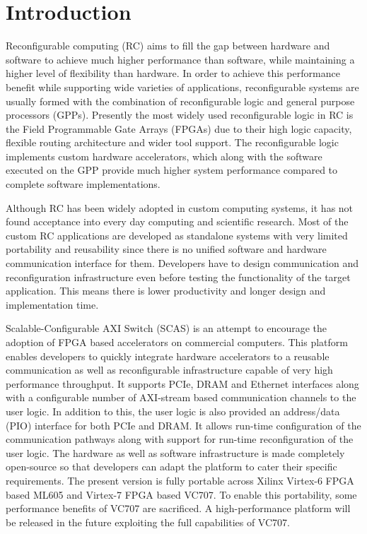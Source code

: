 \chapter{Introduction}
\label{chap_intro}

Reconfigurable computing (RC) aims to fill the gap between hardware and software to achieve much higher performance than software, while maintaining a higher level of flexibility than hardware.
In order to achieve this performance benefit while supporting wide varieties of applications, reconfigurable systems are usually formed with the combination of reconfigurable logic and general purpose processors (GPPs).
Presently the most widely used reconfigurable logic in RC is the Field Programmable Gate Arrays (FPGAs) due to their high logic capacity, flexible routing architecture and wider tool support.
The reconfigurable logic implements custom hardware accelerators, which along with the software executed on the GPP provide much higher system performance compared to complete software implementations.

Although RC has been widely adopted in custom computing systems, it has not found acceptance into every day computing and scientific research.
Most of the custom RC applications are developed as standalone systems with very limited portability and reusability since there is no unified software and hardware communication interface for them.
Developers have to design communication and reconfiguration infrastructure even before testing the functionality of the target application.
This means there is lower productivity and longer design and implementation time.

Scalable-Configurable AXI Switch (SCAS) is an attempt to encourage the adoption of FPGA based accelerators on commercial computers.
This platform enables developers to quickly integrate hardware accelerators to a reusable communication as well as reconfigurable infrastructure capable of very high performance throughput. 
It supports PCIe, DRAM and Ethernet interfaces along with a configurable number of AXI-stream based communication channels to the user logic.
In addition to this, the user logic is also provided an address/data (PIO) interface for both PCIe and DRAM.
It allows run-time configuration of the communication pathways along with support for run-time reconfiguration of the user logic.
The hardware as well as software infrastructure is made completely open-source so that developers can adapt the platform to cater their specific requirements.
The present version is fully portable across Xilinx Virtex-6 FPGA based ML605 and Virtex-7 FPGA based VC707.
To enable this portability, some performance benefits of VC707 are sacrificed.
A high-performance platform will be released in the future exploiting the full capabilities of VC707.